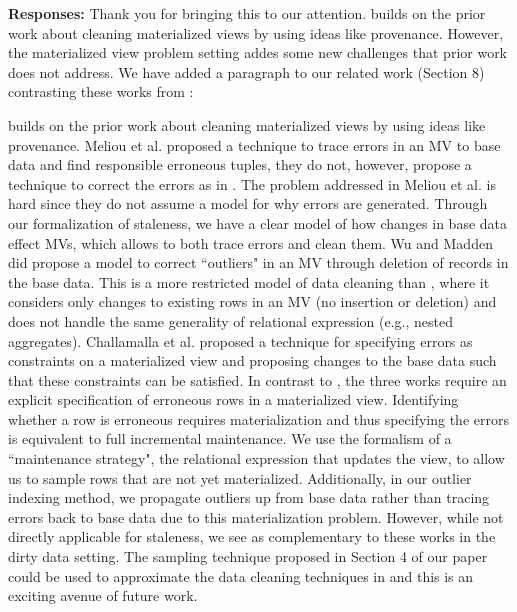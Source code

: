 {\bf Responses:} Thank you for bringing this to our attention.
\svc builds on the prior work about cleaning materialized views by using ideas like provenance.
However, the materialized view problem setting addes some new challenges that prior work does not address.
We have added a paragraph to our related work (Section 8) contrasting these works from \svc:
\begin{displayquote}
\svc builds on the prior work about cleaning materialized views by using ideas like provenance.
Meliou et al. \cite{DBLP:conf/sigmod/MeliouGNS11} proposed a technique to trace errors in an MV to base data and find responsible erroneous tuples, they do not, however, propose a technique to correct the errors as in \svc.
The problem addressed in Meliou et al. is hard since they do not assume a model for why errors are generated.
Through our formalization of staleness, we have a clear model of how changes in base data effect MVs, which allows to both trace errors and clean them.
Wu and Madden \cite{DBLP:journals/pvldb/0002M13} did propose a model to correct ``outliers" in an MV through deletion of records in the base data.
This is a more restricted model of data cleaning than \svc, where it considers only changes to existing rows in an MV (no insertion or deletion) and does not handle the same generality of relational expression (e.g., nested aggregates).
Challamalla et al. \cite{DBLP:conf/sigmod/ChalamallaIOP14} proposed a technique for specifying errors as constraints on a materialized view and proposing changes to the base data such that these constraints can be satisfied.
In contrast to \svc, the three works \cite{DBLP:conf/sigmod/MeliouGNS11, DBLP:journals/pvldb/0002M13, DBLP:conf/sigmod/ChalamallaIOP14} require an explicit specification of erroneous rows in a materialized view.
Identifying whether a row is erroneous requires materialization and thus specifying the errors is equivalent to full incremental maintenance. 
We use the formalism of a ``maintenance strategy", the relational expression that updates the view, to allow us to sample rows that are not yet materialized.
Additionally, in our outlier indexing method, we propagate outliers up from base data rather than tracing errors back to base data due to this materialization problem.
However, while not directly applicable for staleness, we see \svc as complementary to these works in the dirty data setting. 
The sampling technique proposed in Section 4 of our paper could be used to approximate the data cleaning techniques in \cite{DBLP:journals/pvldb/0002M13, DBLP:journals/pvldb/0002M13, DBLP:conf/sigmod/ChalamallaIOP14} and this is an exciting avenue of future work. \end{displayquote}

